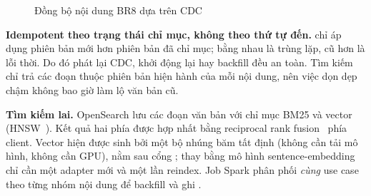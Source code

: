 \begin{figure}[H]
\centering
{}
\caption{Đồng bộ nội dung BR8 dựa trên CDC}
\label{fig:sync}
\end{figure}

\textbf{Idempotent theo trạng thái chỉ mục, không theo thứ tự đến.}  chỉ áp dụng phiên bản mới hơn phiên bản đã chỉ mục; bằng nhau là trùng lặp, cũ hơn là lỗi thời. Do đó phát lại CDC, khởi động lại hay backfill đều an toàn. Tìm kiếm chỉ trả các đoạn thuộc phiên bản hiện hành của mỗi nội dung, nên việc dọn dẹp chậm không bao giờ làm lộ văn bản cũ.

\textbf{Tìm kiếm lai.} OpenSearch lưu các đoạn văn bản với chỉ mục BM25 và vector  (HNSW~\cite{malkov2018hnsw}). Kết quả hai phía được hợp nhất bằng reciprocal rank fusion~\cite{cormack2009rrf} phía client. Vector hiện được sinh bởi một bộ nhúng băm tất định (không cần tải mô hình, không cần GPU), nằm sau cổng ; thay bằng mô hình sentence-embedding chỉ cần một adapter mới và một lần reindex. Job Spark  phân phối \emph{cùng} use case theo từng nhóm nội dung để backfill và ghi .


